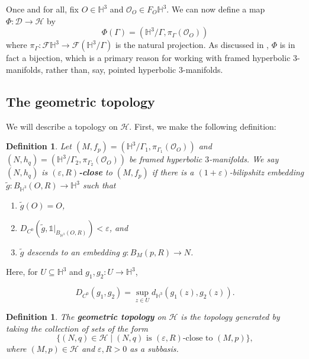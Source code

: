 \documentclass[11pt,leqno]{article}
\newtheorem{defn}[lemma]{Definition}
\theoremstyle{introdef}
\numberwithin{lemma}{section}
\theoremstyle{definition}
\begin{document}
Once and for all, fix $O\in\mathbb{H}^3$ and $\mathcal{O}_O\in F_O\mathbb{H}^3$.  We can now define a map $\Phi:\mathcal{D}\rightarrow \mathcal{H}$ by \[\Phi(\Gamma)=(\mathbb{H}^3/\Gamma,\pi_\Gamma(\mathcal{O}_O))\] where $\pi_\Gamma:\mathcal{F}\mathbb{H}^3\rightarrow\mathcal{F}(\mathbb{H}^3/\Gamma)$ is the natural projection. As discussed in \cite[E.1.9]{BEN}, $\Phi$ is in fact a bijection, which is a primary reason for working with framed hyperbolic $3$-manifolds, rather than, say, pointed hyperbolic $3$-manifolds.\par


\subsection{The geometric topology}
\label{subsec-GeometricTopology}

We will describe a topology on $\mathcal{H}$. First, we make the following definition:

\begin{defn}
    \label{eRclosedef2}
   Let $(M,f_p)=(\mathbb{H}^3/\Gamma_1,\pi_{\Gamma_1}(\mathcal{O}_O))$ and $(N,h_q)=(\mathbb{H}^3/\Gamma_2,\pi_{\Gamma_2}(\mathcal{O}_O))$ be framed hyperbolic $3$-manifolds. We say $(N,h_q)$ is $(\varepsilon,R)$\textbf{-close} to $(M,f_p)$ if there is a $(1+\varepsilon)$-bilipshitz embedding $\tilde{g}:B_{\mathbb{H}^3}(O,R)\rightarrow\mathbb{H}^3$ such that 
    \begin{enumerate}
        \item $\tilde{g}(O)=O$,
         \item $D_{C^{0}}(\tilde{g},\mathds{1}|_{B_{\mathbb{H}^3}(O,R)})<\varepsilon$, and
        \item $\tilde{g}$ descends to an embedding $g:B_M(p,R)\rightarrow N$.
    \end{enumerate}
\end{defn}

Here, for $U\subseteq\mathbb{H}^3$ and $g_1,g_2:U\rightarrow\mathbb{H}^3$,

\[D_{C^0}(g_1,g_2)=\sup_{z\in U}d_{\mathbb{H}^3}(g_1(z),g_2(z)).\]

\begin{defn}
\label{geomtopdef}
    The \textbf{geometric topology} on $\mathcal{H}$ is the topology generated by taking the collection of sets of the form 
    \[\{(N,q)\in\mathcal{H}\;|\;(N,q) \text{ is }(\varepsilon,R)\text{-close to }(M,p)\},\]
    where $(M,p)\in\mathcal{H}$ and $\varepsilon,R>0$ as a subbasis.
\end{defn}
\end{document}
